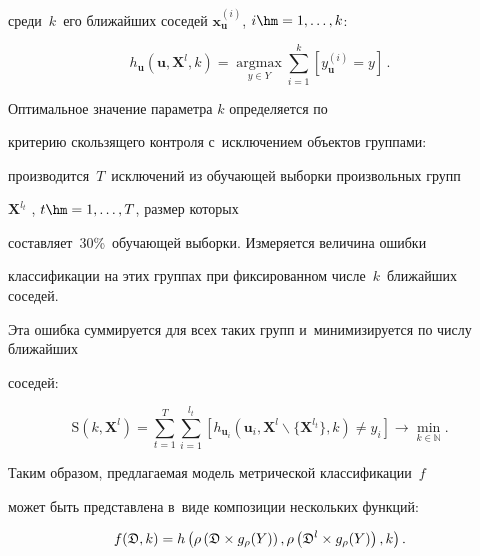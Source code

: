  среди~$k$~его ближайших соседей $\mathbf{x}^{(i)}_{\mathbf{u}}$, $i \hm= 1,\ldots,k$:

\begin{equation*}

h_{\mathbf{u}}\left(\mathbf{u},\mathbf{X}^l,k\right) = 

\mathop{\mathrm{argmax}}\limits_{{y \in Y}}

\sum\limits_{i=1}^{k}\left[y^{(i)}_{\mathbf{u}} = y\right]\,.

\end{equation*}



Оптимальное значение параметра $k$ определяется по 

критерию скользящего контроля с~исключением объектов группами: 

производится~$T$~исключений из обучающей выборки произвольных групп 

$\mathbf{X}^{l_t}$ , $t \hm= 1, \ldots ,T$, размер которых 

составляет~30\%~обучающей выборки. Измеряется величина ошибки 

классификации на этих группах при фиксированном числе~$k$~ближайших соседей. 

Эта ошибка суммируется для всех таких групп и~минимизируется по числу ближайших 

соседей:

\begin{equation}

\mathrm{S}(k,\mathbf{X}^l) = \sum\limits_{t=1}^{T}

\sum\limits_{i=1}^{l_t}

\left[h_{\mathbf{u}_i}(\mathbf{u}_i,\mathbf{X}^l

\backslash\{\mathbf{X}^{l_t}\},k)\neq y_i\right]\rightarrow 

\min\limits_{k \in \mathbb{N}}.

\label{e3-p}

\end{equation}



Таким образом, предлагаемая модель метрической классификации~$f$ 

может быть представлена в~виде композиции нескольких функций:

\begin{equation*}

f(\fD,k) = h\left(\rho\left(\fD\times g_{\rho}(Y)\right), 

\rho\left(\fD^l\times g_{\rho}(Y)\right), k\right).

\end{equation*}

